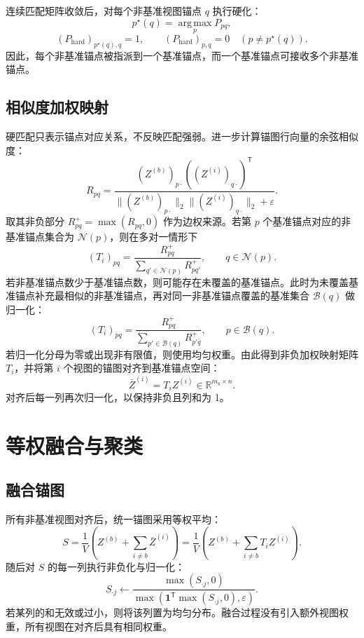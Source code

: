 \documentclass[UTF8,a4paper,12pt,fontset=none]{ctexart}
\newcommand{\R}{\mathbb{R}}
\newcommand{\argmax}{\operatorname*{arg\,max}}
\newcommand{\epsv}{\varepsilon}
\newcommand{\one}{\mathbf{1}}
\newcommand{\T}{\mathsf{T}}
\begin{document}
连续匹配矩阵收敛后，对每个非基准视图锚点 \(q\) 执行硬化：
\begin{equation}
p^\star(q)=\argmax_p P_{pq},
\end{equation}
\[
(P_{\mathrm{hard}})_{p^\star(q),q}=1,\qquad
(P_{\mathrm{hard}})_{p,q}=0\quad (p\ne p^\star(q)).
\]
因此，每个非基准锚点被指派到一个基准锚点，而一个基准锚点可接收多个非基准锚点。

\subsection{相似度加权映射}

硬匹配只表示锚点对应关系，不反映匹配强弱。进一步计算锚图行向量的余弦相似度：
\begin{equation}
R_{pq}
=
\frac{
(Z^{(b)})_{p\cdot}
\left((Z^{(i)})_{q\cdot}\right)^\T
}{
\|(Z^{(b)})_{p\cdot}\|_2
\|(Z^{(i)})_{q\cdot}\|_2+\epsv
}.
\end{equation}
取其非负部分 \(R_{pq}^{+}=\max(R_{pq},0)\) 作为边权来源。若第 \(p\) 个基准锚点对应的非基准锚点集合为 \(\mathcal N(p)\)，则在多对一情形下
\begin{equation}
(T_i)_{pq}
=
\frac{R_{pq}^{+}}
{\sum_{q'\in\mathcal N(p)}R_{pq'}^{+}},
\qquad q\in\mathcal N(p).
\end{equation}
若非基准锚点数少于基准锚点数，则可能存在未覆盖的基准锚点。此时为未覆盖基准锚点补充最相似的非基准锚点，再对同一非基准锚点覆盖的基准集合 \(\mathcal B(q)\) 做归一化：
\begin{equation}
(T_i)_{pq}
=
\frac{R_{pq}^{+}}
{\sum_{p'\in\mathcal B(q)}R_{p'q}^{+}},
\qquad p\in\mathcal B(q).
\end{equation}
若归一化分母为零或出现非有限值，则使用均匀权重。由此得到非负加权映射矩阵 \(T_i\)，并将第 \(i\) 个视图的锚图对齐到基准锚点空间：
\begin{equation}
\bar Z^{(i)}=T_iZ^{(i)}\in\R^{m_b\times n}.
\end{equation}
对齐后每一列再次归一化，以保持非负且列和为 1。

\section{等权融合与聚类}

\subsection{融合锚图}

所有非基准视图对齐后，统一锚图采用等权平均：
\begin{equation}
S=
\frac{1}{V}
\left(
Z^{(b)}+\sum_{i\ne b}\bar Z^{(i)}
\right)
=
\frac{1}{V}
\left(
Z^{(b)}+\sum_{i\ne b}T_iZ^{(i)}
\right).
\label{eq:fusion}
\end{equation}
随后对 \(S\) 的每一列执行非负化与归一化：
\begin{equation}
S_{\cdot j}
\leftarrow
\frac{\max(S_{\cdot j},0)}
{\max(\one^\T\max(S_{\cdot j},0),\epsv)} .
\end{equation}
若某列的和无效或过小，则将该列置为均匀分布。融合过程没有引入额外视图权重，所有视图在对齐后具有相同权重。
\end{document}
